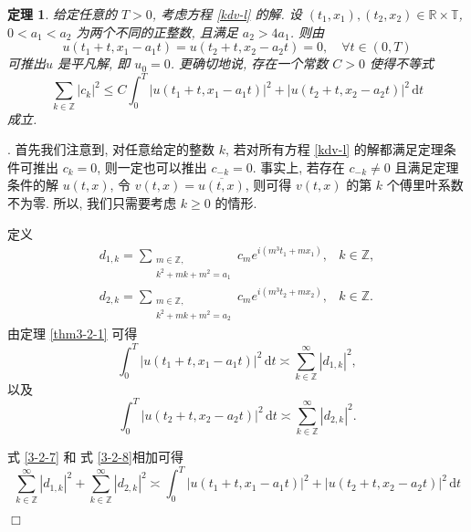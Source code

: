 \documentclass[master]{cugthesis}
\newcommand\R{\ensuremath{\mathbb{R}}}
\newcommand\Z{\ensuremath{\mathbb{Z}}}
\newcommand\T{\ensuremath{\mathbb{T}}}
\renewcommand\d{\ensuremath{\,\mathrm{d}}}
\newtheorem{theorem}{定理}[chapter]
\newenvironment{proof}{{\noindent\itshape 证明}.}{\hfill $\Box$\par}
\begin{document}
        \begin{theorem}
    给定任意的 $T>0$, 考虑方程 \eqref{kdv-l} 的解. 设 $(t_1,x_1), (t_2,x_2)\in \R\times \T$, $0<a_1<a_2$ 为两个不同的正整数, 且满足 $a_2>4a_1$. 则由 
    \begin{equation*}
        u(t_1+t,x_1-a_1t)=u(t_2+t,x_2-a_2t)=0,\quad \forall t\in (0,T)
    \end{equation*}
    可推出$u$ 是平凡解, 即 $u_0=0$. 更确切地说, 存在一个常数 $C>0$ 使得不等式
    \begin{equation}\label{3-2-10}
        \sum_{k\in\Z} |c_k|^2\le C\int_0^T|u(t_1+t,x_1-a_1t)|^2+|u(t_2+t,x_2-a_2t)|^2 \d t
    \end{equation}
    成立.
    \end{theorem}
    \begin{proof}
    首先我们注意到, 对任意给定的整数 $k$, 若对所有方程 \eqref{kdv-l} 的解都满足定理条件可推出 $c_k=0$, 则一定也可以推出 $c_{-k}=0$. 事实上, 若存在 $c_{-k}\neq 0$ 且满足定理条件的解 $u(t,x)$, 令 $v(t,x)=\overline{u(t,x)}$, 则可得 $v(t,x)$ 的第 $k$ 个傅里叶系数不为零.
    所以, 我们只需要考虑 $k\ge 0$ 的情形.
    
    定义
    \begin{equation*}
        \begin{array}{ll}
                        d_{1,k}=\sum\limits_{\substack{
                m\in \Z,  \\
                k^2+mk+m^2 = a_1 }} 
             c_me^{i(m^3t_1+mx_1)}, & k\in \Z, \\
                        d_{2,k}=\sum\limits_{\substack{
                m\in \Z,  \\
                k^2+mk+m^2 = a_2 }} 
             c_me^{i(m^3t_2+mx_2)}, & k\in \Z. 
        \end{array}
    \end{equation*}
    由定理 \ref{thm3-2-1} 可得
\begin{equation}\label{3-2-7}
    \int_0^T |u(t_1+t,x_1-a_1t)|^2\d t\asymp \sum_{k\in\Z}^\infty|d_{1,k}|^2,
\end{equation}
以及
\begin{equation}\label{3-2-8}
    \int_0^T |u(t_2+t,x_2-a_2t)|^2\d t\asymp \sum_{k\in\Z}^\infty|d_{2,k}|^2.
\end{equation}

式 \eqref{3-2-7} 和 式 \eqref{3-2-8}相加可得
\begin{equation}\label{3-2-9}
  \sum_{k\in\Z}^\infty|d_{1,k}|^2+\sum_{k\in\Z}^\infty|d_{2,k}|^2\asymp \int_0^T |u(t_1+t,x_1-a_1t)|^2 + |u(t_2+t,x_2-a_2t)|^2\d t
\end{equation}
    

\end{proof}
\end{document}
